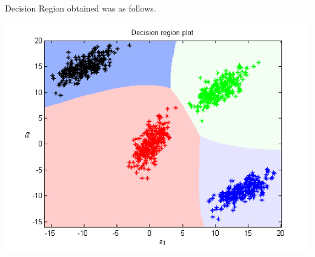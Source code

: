 \documentclass{article}
\begin{document}
Decision Region obtained was as follows.
\begin{center}
\includegraphics[scale=1]{Classification/1a/c_poly/dec}
\end{center}
\end{document}
